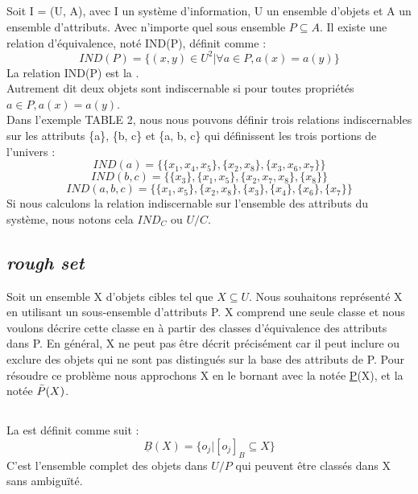 \subsection{\ind}
Soit I = (U, A), avec I un système d'information, U un ensemble
d'objets et A un ensemble d'attributs. Avec n'importe quel sous
ensemble $P \subseteq A$. Il existe une relation d'équivalence,
noté IND(P), définit comme :
\begin{equation}
    IND(P) = \{(x, y) \in U^2 | \forall a \in P, a(x) = a(y)\}
\end{equation}
La relation IND(P) est la \ind. \\
Autrement dit deux objets sont indiscernable si pour toutes
propriétés $a \in P, a(x) = a(y)$. \\
Dans l'exemple TABLE 2, nous nous pouvons définir trois
relations indiscernables sur les attributs \{a\}, \{b, c\} et
\{a, b, c\} qui définissent les trois portions de l'univers :
\begin{equation}
    IND(a) = \{\{x_1, x_4, x_5\}, \{x_2, x_8\}, \{x_3, x_6, x_7\}\}
\end{equation}
\begin{equation}
    IND(b, c) = \{\{x_3\}, \{x_1, x_5\}, \{x_2, x_7, x_8\}, \{x_8\}\}
\end{equation}
\begin{equation}
    IND(a, b, c) = \{\{x_1, x_5\}, \{x_2, x_8\}, \{x_3\},
    \{x_4\}, \{x_6\}, \{x_7\}\}
\end{equation}
Si nous calculons la relation indiscernable sur l'ensemble des
attributs du système, nous notons cela $IND_C$ ou $U/C$.

\subsection{\textit{rough set}}
Soit un ensemble X d'objets cibles tel que $X \subseteq U$.
Nous souhaitons représenté X en utilisant un sous-ensemble
d'attributs P. X comprend une seule classe et nous voulons
décrire cette classe en à partir des classes d'équivalence des
attributs dans P. En général, X ne peut pas être décrit
précisément car il peut inclure ou exclure des objets qui
ne sont pas distingués sur la base des attributs de P.
Pour résoudre ce problème nous approchons X en le bornant avec
la \blower notée \underline{P}(X), et
la \bupper notée $\Bar{P}(X)$. \\

\newpage
\subsection{\blower}
La \blower est définit comme suit :
\begin{equation}
    \underline{B}(X) = \{o_j | [o_j]_B \subseteq X\}
\end{equation}
C'est l'ensemble complet des objets dans
$U/P$ qui peuvent être classés dans X sans ambiguïté.


